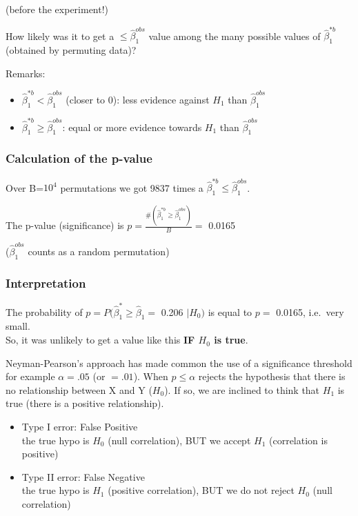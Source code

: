 \documentclass[
]{article}
\providecommand{\tightlist}{%
  \setlength{\itemsep}{0pt}\setlength{\parskip}{0pt}}
\begin{document}
(before the experiment!)

How likely was it to get a \(\leq \hat{\beta}_1 ^{obs}\) value among the
many possible values of \(\hat{\beta}_1 ^{*b}\) (obtained by permuting
data)?

Remarks:

\begin{itemize}
\tightlist
\item
  \(\hat{\beta}_1 ^{* b}< \hat{\beta}_1 ^{obs}\) (closer to 0): less
  evidence against \(H_1\) than \(\hat{\beta}_1 ^{obs}\)
\item
  \(\hat{\beta}_1 ^{* b} \geq \hat{\beta}_1 ^{obs}\): equal or more
  evidence towards \(H_1\) than \(\hat{\beta}_1 ^{obs}\)
\end{itemize}

\hypertarget{calculation-of-the-p-value}{%
\subsubsection{Calculation of the
p-value}\label{calculation-of-the-p-value}}

Over B=\ensuremath{10^{4}} permutations we got 9837 times a
\(\hat{\beta}_1 ^{* b} \leq \hat{\beta}_1 ^{obs}\).

The p-value (significance) is
\(p=\frac{\# (\hat{\beta}_1 ^{* b} \geq \hat{\beta}_1 ^{obs})}{B} =\)
0.0165

(\(\hat{\beta}_1 ^{obs}\) counts as a random permutation)

\hypertarget{interpretation}{%
\subsubsection{Interpretation}\label{interpretation}}

The probability of \(p=P (\hat{\beta}_1 ^ * \geq \hat{\beta}_1=\) 0.206
\(| H_0)\) is equal to \(p =\) 0.0165, i.e.~very small.\\
So, it was unlikely to get a value like this \textbf{IF \(H_0\) is
true}.

Neyman-Pearson's approach has made common the use of a significance
threshold for example \(\alpha=.05\) (or \(=. 01\)). When
\(p \leq \alpha\) rejects the hypothesis that there is no relationship
between X and Y (\(H_0\)). If so, we are inclined to think that \(H_1\)
is true (there is a positive relationship).

\begin{itemize}
\tightlist
\item
  Type I error: False Positive\\
  the true hypo is \(H_0\) (null correlation), BUT we accept \(H_1\)
  (correlation is positive)
\item
  Type II error: False Negative\\
  the true hypo is \(H_1\) (positive correlation), BUT we do not reject
  \(H_0\) (null correlation)
\end{itemize}
\end{document}
